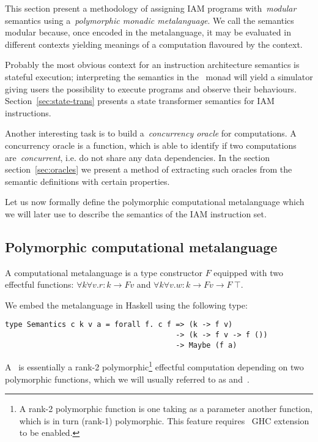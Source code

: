 This section present a methodology of assigning IAM programs with~\emph{modular}
semantics using a~\emph{polymorphic monadic metalanguage}. We call the semantics modular because,
once encoded in the metalanguage, it may be evaluated in different contexts yielding
meanings of a computation flavoured by the context.

Probably the most obvious context for an instruction architecture semantics is
stateful execution; interpreting the semantics in the~ monad will yield
a simulator giving users the possibility to execute programs and observe
their behaviours. Section~\ref{sec:state-trans} presents a state transformer
semantics for IAM instructions.

Another interesting task is to build a~\emph{concurrency oracle} for computations.
A concurrency oracle is a function, which is able to identify if two computations
are~\emph{concurrent}, i.e. do not share any data dependencies.
In the section section~\ref{sec:oracles} we present a method of extracting
such oracles from the semantic definitions with certain properties.

Let us now formally define the polymorphic computational metalanguage which we will
later use to describe the semantics of the IAM instruction set.

\subsection{Polymorphic computational metalanguage}

\begin{definition}
\label{def:metalanguage}
A computational metalanguage is a type constructor $F$ equipped with two effectful
functions: $\forall k \forall v.r: k \rightarrow F v$ and
$\forall k \forall v.w: k \rightarrow F v \rightarrow F~\top$.
\end{definition}



We embed the metalanguage in Haskell using the following type:

\begin{verbatim}
type Semantics c k v a = forall f. c f => (k -> f v)
                                       -> (k -> f v -> f ())
                                       -> Maybe (f a)
\end{verbatim}

A~ is essentially a rank-2 polymorphic\footnote{A rank-2 polymorphic
function is one taking as a parameter another function, which is in turn (rank-1)
polymorphic. This feature requires~ GHC extension to be enabled.}
effectful computation depending on two polymorphic functions,
which we will usually referred to as  and~.


